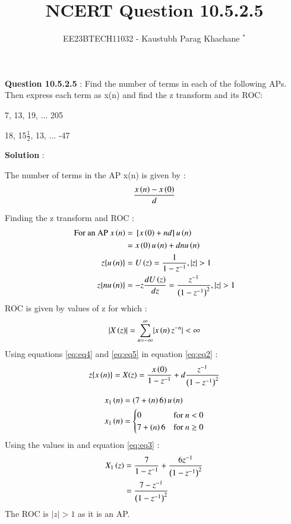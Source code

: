 \documentclass[journal,12pt,twocolumn]{IEEEtran}
\theoremstyle{remark}
\begin{document}

\vspace{3cm}

\Large\title{NCERT Question 10.5.2.5}
\large\author{EE23BTECH11032 - Kaustubh Parag Khachane $^{*}$%
}
\maketitle
\newpage
\bigskip

\renewcommand{\thefigure}{\theenumi}
\renewcommand{\thetable}{\theenumi}
\large\textbf{Question 10.5.2.5} : \normalsize Find the number of terms in each of the following APs. Then express each term as x(n) and find the z transform and its ROC: 

 7, 13, 19, ... 205

 18, 15$\frac{1}{2}$, 13, ... -47


\large\textbf{Solution} :\normalsize


The number of terms in the AP x(n) is given by : 
\begin{align}  \label{eq:eq12}
    \frac{x\left(n\right) - x\left(0\right)}{d}
\end{align}



Finding the z transform and ROC : \\
\begin{align}
\text{For an AP } x\left(n\right) &= {}\left[x\left(0\right) + nd\right]u\left(n\right)\\
&=x\left(0\right)u\left(n\right) + dnu\left(n\right)\label{eq:eq2}\\
   z\{u\left(n\right)\} &=  U\left(z\right) = \frac{1}{1 - z^{-1}} , |z| > 1\label{eq:eq4}\\
   z\{nu\left(n\right)\} &= -z\frac{dU\left(z\right)}{dz} = \frac{z^{-1}}{\left(1-z^{-1}\right)^2},|z| > 1 \label{eq:eq5}
\end{align}
ROC is given by values of z for which :
\begin{align}
    \lvert X\left(z\right)\rvert = \sum_{n = -\infty}^{\infty}\lvert x\left(n\right)z^{-n}\rvert < \infty
\end{align}
Using equations \eqref{eq:eq4} and \eqref{eq:eq5} in equation \eqref{eq:eq2} :
\begin{align}\label{eq:eq3}
    z\{x\left(n\right)\} = X(z) = \frac{x\left(0\right)}{1 - z^{-1}} + d\frac{z^{-1}}{\left(1-z^{-1}\right)^2}
\end{align}
\textbf{}

\begin{align}
x_{1}\left(n\right) &= \left(7 + \left(n\right)6\right)u\left(n\right)\\
     x_{1}\left(n\right) & = \begin{cases} 
        0 & \text{for } n < 0 \\
        7 + \left(n\right)6 & \text{for } n \geq 0
    \end{cases}
\end{align}
Using the values in  and equation \eqref{eq:eq3} :
\begin{align}
X_{1}\left(z\right) &= \frac{7}{1 - z^{-1}} + \frac{6z^{-1}}{\left(1 - z^{-1}\right)^2}\\
 &= \frac{7 - z^{-1}}{\left(1-z^{-1}\right)^2}
 \end{align}
 The ROC is $|z|>1$ as it is an AP.
 
\end{document}
